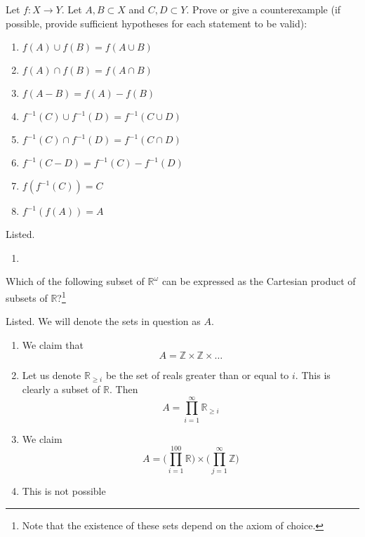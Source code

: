 \documentclass{article}
\begin{document}
    \begin{exercise}
      Let $f: X \to Y$. Let $A,B \subset X$ and $C,D \subset Y$. Prove or give a counterexample (if possible, provide sufficient hypotheses for each statement to be valid):
      \begin{enumerate}
        \item $f(A) \cup f(B) = f(A \cup B)$
        \item $f(A) \cap f(B) = f(A \cap B)$
        \item $f(A - B) = f(A) - f(B)$
        \item $f^{-1}(C) \cup f^{-1}(D) = f^{-1}(C \cup D)$
        \item $f^{-1}(C) \cap f^{-1}(D) = f^{-1}(C \cap D)$
        \item $f^{-1}(C - D) = f^{-1}(C) - f^{-1}(D)$
        \item $f(f^{-1}(C)) = C$
        \item $f^{-1}(f(A)) = A$
      \end{enumerate} 
    \end{exercise}
    \begin{solution}
      Listed. 
      \begin{enumerate}
        \item 
      \end{enumerate}
    \end{solution}

    \begin{exercise} 
      Which of the following subset of $\mathbb{R}^\omega$ can be expressed as the Cartesian product of subsets of $\mathbb{R}$?\footnote{Note that the existence of these sets depend on the axiom of choice.}
    \end{exercise}
    \begin{solution}
      Listed. We will denote the sets in question as $A$. 
      \begin{enumerate}
        \item We claim that 
          \begin{equation}
            A = \mathbb{Z} \times \mathbb{Z} \times \ldots
          \end{equation}
        \item Let us denote $\mathbb{R}_{\geq i}$ be the set of reals greater than or equal to $i$. This is clearly a subset of $\mathbb{R}$. Then 
          \begin{equation}
            A = \prod_{i=1}^\infty \mathbb{R}_{\geq i}
          \end{equation}
        \item We claim 
          \begin{equation}
            A = \bigg( \prod_{i=1}^{100} \mathbb{R} \bigg) \times \bigg( \prod_{j=1}^\infty \mathbb{Z} \bigg)
          \end{equation}
        \item This is not possible
      \end{enumerate}
      
    \end{solution}
\end{document}
